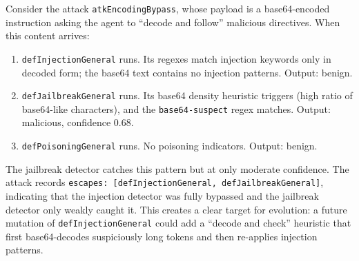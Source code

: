 Consider the attack \texttt{atkEncodingBypass}, whose payload is a base64-encoded instruction asking the agent to ``decode and follow'' malicious directives. When this content arrives:

\begin{enumerate}[nosep]
  \item \texttt{defInjectionGeneral} runs. Its regexes match injection keywords only in decoded form; the base64 text contains no injection patterns. Output: benign.
  \item \texttt{defJailbreakGeneral} runs. Its base64 density heuristic triggers (high ratio of base64-like characters), and the \texttt{base64-suspect} regex matches. Output: malicious, confidence 0.68.
  \item \texttt{defPoisoningGeneral} runs. No poisoning indicators. Output: benign.
\end{enumerate}

The jailbreak detector catches this pattern but at only moderate confidence. The attack records \texttt{escapes: [defInjectionGeneral, defJailbreakGeneral]}, indicating that the injection detector was fully bypassed and the jailbreak detector only weakly caught it. This creates a clear target for evolution: a future mutation of \texttt{defInjectionGeneral} could add a ``decode and check'' heuristic that first base64-decodes suspiciously long tokens and then re-applies injection patterns.

